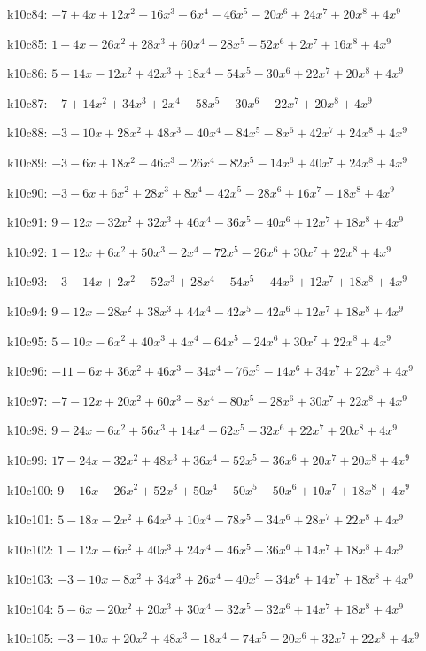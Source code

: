 k10c84: $ -7+4x+12x^{2}+16x^{3}-6x^{4}-46x^{5}-20x^{6}+24x^{7}+20x^{8}+4x^{9} $ 

k10c85: $ 1-4x-26x^{2}+28x^{3}+60x^{4}-28x^{5}-52x^{6}+2x^{7}+16x^{8}+4x^{9} $ 

k10c86: $ 5-14x-12x^{2}+42x^{3}+18x^{4}-54x^{5}-30x^{6}+22x^{7}+20x^{8}+4x^{9} $ 

k10c87: $ -7+14x^{2}+34x^{3}+2x^{4}-58x^{5}-30x^{6}+22x^{7}+20x^{8}+4x^{9} $ 

k10c88: $ -3-10x+28x^{2}+48x^{3}-40x^{4}-84x^{5}-8x^{6}+42x^{7}+24x^{8}+4x^{9} $ 

k10c89: $ -3-6x+18x^{2}+46x^{3}-26x^{4}-82x^{5}-14x^{6}+40x^{7}+24x^{8}+4x^{9} $ 

k10c90: $ -3-6x+6x^{2}+28x^{3}+8x^{4}-42x^{5}-28x^{6}+16x^{7}+18x^{8}+4x^{9} $ 

k10c91: $ 9-12x-32x^{2}+32x^{3}+46x^{4}-36x^{5}-40x^{6}+12x^{7}+18x^{8}+4x^{9} $ 

k10c92: $ 1-12x+6x^{2}+50x^{3}-2x^{4}-72x^{5}-26x^{6}+30x^{7}+22x^{8}+4x^{9} $ 

k10c93: $ -3-14x+2x^{2}+52x^{3}+28x^{4}-54x^{5}-44x^{6}+12x^{7}+18x^{8}+4x^{9} $ 

k10c94: $ 9-12x-28x^{2}+38x^{3}+44x^{4}-42x^{5}-42x^{6}+12x^{7}+18x^{8}+4x^{9} $ 

k10c95: $ 5-10x-6x^{2}+40x^{3}+4x^{4}-64x^{5}-24x^{6}+30x^{7}+22x^{8}+4x^{9} $ 

k10c96: $ -11-6x+36x^{2}+46x^{3}-34x^{4}-76x^{5}-14x^{6}+34x^{7}+22x^{8}+4x^{9} $ 

k10c97: $ -7-12x+20x^{2}+60x^{3}-8x^{4}-80x^{5}-28x^{6}+30x^{7}+22x^{8}+4x^{9} $ 

k10c98: $ 9-24x-6x^{2}+56x^{3}+14x^{4}-62x^{5}-32x^{6}+22x^{7}+20x^{8}+4x^{9} $ 

k10c99: $ 17-24x-32x^{2}+48x^{3}+36x^{4}-52x^{5}-36x^{6}+20x^{7}+20x^{8}+4x^{9} $ 

k10c100: $ 9-16x-26x^{2}+52x^{3}+50x^{4}-50x^{5}-50x^{6}+10x^{7}+18x^{8}+4x^{9} $ 

k10c101: $ 5-18x-2x^{2}+64x^{3}+10x^{4}-78x^{5}-34x^{6}+28x^{7}+22x^{8}+4x^{9} $ 

k10c102: $ 1-12x-6x^{2}+40x^{3}+24x^{4}-46x^{5}-36x^{6}+14x^{7}+18x^{8}+4x^{9} $ 

k10c103: $ -3-10x-8x^{2}+34x^{3}+26x^{4}-40x^{5}-34x^{6}+14x^{7}+18x^{8}+4x^{9} $ 

k10c104: $ 5-6x-20x^{2}+20x^{3}+30x^{4}-32x^{5}-32x^{6}+14x^{7}+18x^{8}+4x^{9} $ 

k10c105: $ -3-10x+20x^{2}+48x^{3}-18x^{4}-74x^{5}-20x^{6}+32x^{7}+22x^{8}+4x^{9} $ 

